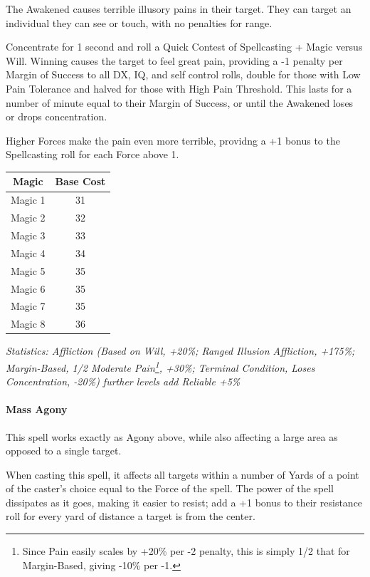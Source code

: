 \begin{multicols}{3}
	The Awakened causes terrible illusory pains in their target. They can target an individual they can see or touch, with no penalties for range.
	
	Concentrate for 1 second and roll a Quick Contest of Spellcasting + Magic versus Will. Winning causes the target to feel great pain, providing a -1 penalty per Margin of Success to all DX, IQ, and self control rolls, double for those with Low Pain Tolerance and halved for those with High Pain Threshold. This lasts for a number of minute equal to their Margin of Success, or until the Awakened loses or drops concentration.
	
	Higher Forces make the pain even more terrible, providng a +1 bonus to the Spellcasting roll for each Force above 1.
	
	\begin{center}
		\begin{tabular}{|c|c|}
			\hline
			Magic & Base Cost \\
			\hline
			\hline
			Magic 1 & 31 \\
			Magic 2 & 32 \\
			Magic 3 & 33 \\
			Magic 4 & 34 \\
			Magic 5 & 35 \\
			Magic 6 & 35 \\
			Magic 7 & 35 \\
			Magic 8 & 36 \\
			\hline
		\end{tabular}
	\end{center}

	\textcolor{OliveGreen}{\textit{Statistics: Affliction (Based on Will, +20\%; Ranged Illusion Affliction, +175\%; Margin-Based, 1/2 Moderate Pain\footnote{Since Pain easily scales by +20\% per -2 penalty, this is simply 1/2 that for Margin-Based, giving -10\% per -1.}, +30\%; Terminal Condition, Loses Concentration, -20\%)  further levels add Reliable +5\%}}
	
	\paragraph{Mass Agony}
	
	This spell works exactly as Agony above, while also affecting a large area as opposed to a single target.
	
	When casting this spell, it affects all targets within a number of Yards of a point of the caster's choice equal to the Force of the spell. The power of the spell dissipates as it goes, making it easier to resist; add a +1 bonus to their resistance roll for every yard of distance a target is from the center.
	

\end{multicols}
